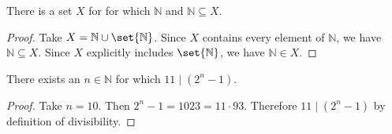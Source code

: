 \documentclass[DIN, pagenumber=false, fontsize=11pt, parskip=half]{scrartcl}
\begin{document}
\begin{problems}
    \problem There is a set $X$ for for which $\mathbb{N}$ and $\mathbb{N} \subseteq X$. 
    \begin{proof}
        Take $X = \mathbb{N} \cup \set{\mathbb{N}}$.
        Since $X$ contains every element of $\mathbb{N}$, we have $\mathbb{N} \subseteq X$.
        Since $X$ explicitly includes $\set{\mathbb{N}}$, we have $\mathbb{N} \in X$. 
    \end{proof}

    \problem There exists an $n \in \mathbb{N}$ for which $11 \mid (2^n-1)$.
    \begin{proof}
        Take $n=10$. Then $2^n-1 = 1023 = 11\cdot93$.
        Therefore $11 \mid (2^n-1)$ by definition of divisibility.
    \end{proof}

\end{problems}
\end{document}
